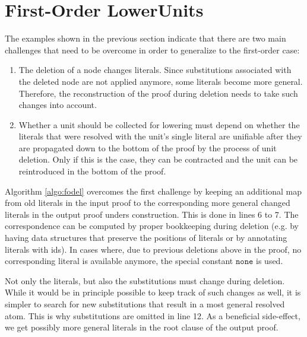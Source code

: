 

\section{First-Order LowerUnits} \label{sec:FOLU}

The examples shown in the previous section indicate that there are two main challenges that need to be overcome in order to generalize \LowerUnits to the first-order case:
\begin{enumerate}
\item The deletion of a node changes literals. Since substitutions associated with the deleted node are not applied anymore, some literals become more general. Therefore, the reconstruction of the proof during deletion needs to take such changes into account.
\item Whether a unit should be collected for lowering must depend on whether the literals that were resolved with the unit's single literal are unifiable after they are propagated down to the bottom of the proof by the process of unit deletion. Only if this is the case, they can be contracted and the unit can be reintroduced in the bottom of the proof.
\end{enumerate}

\newcommand{\none}{\texttt{none}}

\noindent
Algorithm \ref{algo:fodel} overcomes the first challenge by keeping an additional map from old literals in the input proof to the corresponding more general changed literals in the output proof unders construction. This is done in lines 6 to 7. The correspondence can be computed by proper bookkeeping during deletion (e.g. by having data structures that preserve the positions of literals or by annotating literals with ids). In cases where, due to previous deletions above in the proof, no corresponding literal is available anymore, the special constant $\none$ is used. 

Not only the literals, but also the substitutions must change during deletion. While it would be in principle possible to keep track of such changes as well, it is simpler to search for new substitutions that result in a most general resolved atom. This is why substitutions are omitted in line 12. As a beneficial side-effect, we get possibly more general literals in the root clause of the output proof.


\clearpage


